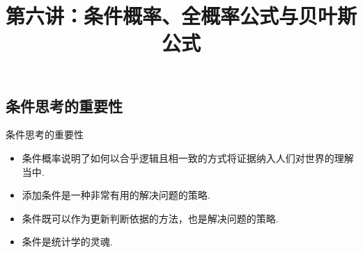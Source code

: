 

\title[概率论]{第六讲：条件概率、全概率公式与贝叶斯公式}
\date{}


{
	\begin{frame}
		\titlepage
	\end{frame}
}


\subsection{条件思考的重要性}%

\begin{frame}{条件思考的重要性}
	\begin{itemize}[<+-|alert@+>]
		\item 条件概率说明了如何以合乎逻辑且相一致的方式将证据纳入人们对世界的理解当中.
        \item 添加条件是一种非常有用的解决问题的策略.
        \item 条件既可以作为更新判断依据的方法，也是解决问题的策略.
        \item 条件是统计学的灵魂.
	\end{itemize}

\end{frame}

